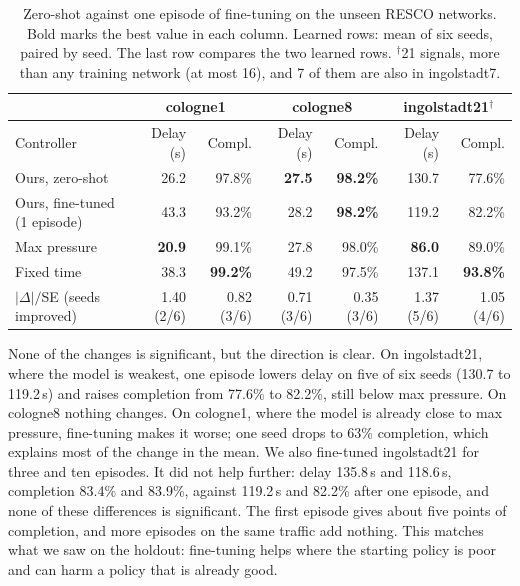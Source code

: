\documentclass[10pt,twocolumn,a4paper]{article}
\begin{document}
\begin{table}[t]
\centering\footnotesize
\setlength{\tabcolsep}{6pt}
\begin{tabular}{|l|r|r|r|r|r|r|}
\hline
 & \multicolumn{2}{c|}{cologne1} & \multicolumn{2}{c|}{cologne8} & \multicolumn{2}{c|}{ingolstadt21$^\dagger$} \\ \hline
Controller & Delay (s) & Compl. & Delay (s) & Compl. & Delay (s) & Compl. \\ \hline
Ours, zero-shot & 26.2 & 97.8\% & \textbf{27.5} & \textbf{98.2\%} & 130.7 & 77.6\% \\ \hline
Ours, fine-tuned (1 episode) & 43.3 & 93.2\% & 28.2 & \textbf{98.2\%} & 119.2 & 82.2\% \\ \hline
Max pressure & \textbf{20.9} & 99.1\% & 27.8 & 98.0\% & \textbf{86.0} & 89.0\% \\ \hline
Fixed time & 38.3 & \textbf{99.2\%} & 49.2 & 97.5\% & 137.1 & \textbf{93.8\%} \\ \hline
$|\Delta|/$SE (seeds improved) & 1.40 (2/6) & 0.82 (3/6) & 0.71 (3/6) & 0.35 (3/6) & 1.37 (5/6) & 1.05 (4/6) \\ \hline
\end{tabular}
\caption{Zero-shot against one episode of fine-tuning on the unseen RESCO networks. Bold marks
the best value in each column. Learned rows: mean of six seeds, paired by seed. The last row
compares the two learned rows. $^\dagger$21 signals, more than any training network (at most
16), and 7 of them are also in ingolstadt7.}
\label{tab:unseen_ft}
\end{table}

None of the changes is significant, but the direction is clear. On ingolstadt21, where the
model is weakest, one episode lowers delay on five of six seeds (130.7 to 119.2\,s) and raises
completion from 77.6\% to 82.2\%, still below max pressure. On cologne8 nothing changes. On
cologne1, where the model is already close to max pressure, fine-tuning makes it worse; one
seed drops to 63\% completion, which explains most of the change in the mean. We also
fine-tuned ingolstadt21 for three and ten episodes. It did not help further: delay 135.8\,s and
118.6\,s, completion 83.4\% and 83.9\%, against 119.2\,s and 82.2\% after one episode, and none
of these differences is significant. The first episode gives about five points of completion,
and more episodes on the same traffic add nothing. This matches
what we saw on the holdout: fine-tuning helps where the starting policy is poor and can harm
a policy that is already good.
\end{document}
